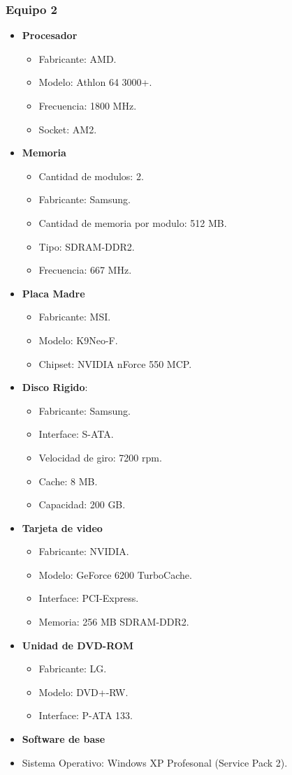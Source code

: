 \subsubsection{Equipo 2}
\begin{itemize}
\item \textbf{Procesador}
	\begin{itemize}
	\item Fabricante: AMD.	
	\item Modelo: Athlon 64 3000+.
	\item Frecuencia: 1800 MHz.
	\item Socket: AM2.
	\end{itemize}
\item \textbf{Memoria}
	\begin{itemize}
	\item Cantidad de modulos: 2.
	\item Fabricante: Samsung.
	\item Cantidad de memoria por modulo: 512 MB.
	\item Tipo: SDRAM-DDR2.
	\item Frecuencia: 667 MHz.
	\end{itemize}
\item \textbf{Placa Madre}
	\begin{itemize}
	\item Fabricante: MSI.	
	\item Modelo: K9Neo-F.
	\item Chipset: NVIDIA nForce 550 MCP.
	\end{itemize}
\item \textbf{Disco Rigido}:
	\begin{itemize}
	\item Fabricante: Samsung.	
	\item Interface: S-ATA.
	\item Velocidad de giro: 7200 rpm.
	\item Cache: 8 MB.
	\item Capacidad: 200 GB.
	\end{itemize}
\item \textbf{Tarjeta de video}
	\begin{itemize}
	\item Fabricante: NVIDIA.
	\item Modelo: GeForce 6200 TurboCache.
	\item Interface: PCI-Express.
	\item Memoria: 256 MB SDRAM-DDR2.
	\end{itemize}
\item \textbf{Unidad de DVD-ROM}
	\begin{itemize}
	\item Fabricante: LG.
	\item Modelo: DVD+-RW.
	\item Interface: P-ATA 133.
	\end{itemize}
\item \textbf{Software de base}
	\item Sistema Operativo: Windows XP Profesonal (Service Pack 2).
\end{itemize} 
